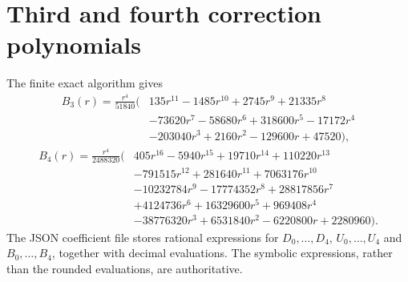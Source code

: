 \documentclass[11pt,letterpaper]{article}
\theoremstyle{remark}\newtheorem{remark}[theorem]{Remark}
\begin{document}
\section{Third and fourth correction polynomials}
\label{pdc:app:coeff}
The finite exact algorithm gives
\begin{align*}
 B_3(r)=\frac{r^4}{51840}\bigl(&135r^{11}-1485r^{10}+2745r^9+21335r^8\\
 &-73620r^7-58680r^6+318600r^5-17172r^4\\
 &-203040r^3+2160r^2-129600r+47520\bigr),
\end{align*}
\begin{align*}
 B_4(r)=\frac{r^4}{2488320}\bigl(&405r^{16}-5940r^{15}+19710r^{14}+110220r^{13}\\
 &-791515r^{12}+281640r^{11}+7063176r^{10}\\
 &-10232784r^9-17774352r^8+28817856r^7\\
 &+4124736r^6+16329600r^5+969408r^4\\
 &-38776320r^3+6531840r^2-6220800r+2280960\bigr).
\end{align*}
The JSON coefficient file stores rational expressions for $D_0,\ldots,D_4$, $U_0,\ldots,U_4$ and $B_0,\ldots,B_4$, together with decimal evaluations. The symbolic expressions, rather than the rounded evaluations, are authoritative.
\end{document}
